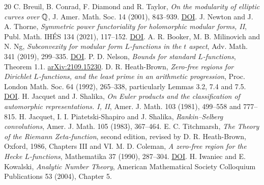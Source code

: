 \documentclass[11pt]{article}
\begin{document}
\begin{thebibliography}{20}
 C. Breuil, B. Conrad, F. Diamond and R. Taylor, \emph{On the modularity of elliptic curves over $\mathbb Q$}, J. Amer. Math. Soc. 14 (2001), 843--939. \href{https://doi.org/10.1090/S0894-0347-01-00370-8}{DOI}.
 J. Newton and J. A. Thorne, \emph{Symmetric power functoriality for holomorphic modular forms, II}, Publ. Math. IH\'ES 134 (2021), 117--152. \href{https://doi.org/10.1007/s10240-021-00126-4}{DOI}.
 A. R. Booker, M. B. Milinovich and N. Ng, \emph{Subconvexity for modular form $L$-functions in the $t$ aspect}, Adv. Math. 341 (2019), 299--335. \href{https://doi.org/10.1016/j.aim.2018.10.037}{DOI}.
 P. D. Nelson, \emph{Bounds for standard $L$-functions}, Theorem 1.1. \href{https://arxiv.org/abs/2109.15230}{arXiv:2109.15230}.
 D. R. Heath-Brown, \emph{Zero-free regions for Dirichlet $L$-functions, and the least prime in an arithmetic progression}, Proc. London Math. Soc. 64 (1992), 265--338, particularly Lemmas 3.2, 7.4 and 7.5. \href{https://doi.org/10.1112/plms/s3-64.2.265}{DOI}.
 H. Jacquet and J. Shalika, \emph{On Euler products and the classification of automorphic representations. I, II}, Amer. J. Math. 103 (1981), 499--558 and 777--815.
 H. Jacquet, I. I. Piatetski-Shapiro and J. Shalika, \emph{Rankin--Selberg convolutions}, Amer. J. Math. 105 (1983), 367--464.
 E. C. Titchmarsh, \emph{The Theory of the Riemann Zeta-function}, second edition, revised by D. R. Heath-Brown, Oxford, 1986, Chapters III and VI.
 M. D. Coleman, \emph{A zero-free region for the Hecke $L$-functions}, Mathematika 37 (1990), 287--304. \href{https://doi.org/10.1112/S0025579300013000}{DOI}.
 H. Iwaniec and E. Kowalski, \emph{Analytic Number Theory}, American Mathematical Society Colloquium Publications 53 (2004), Chapter 5.
\end{thebibliography}
\end{document}
